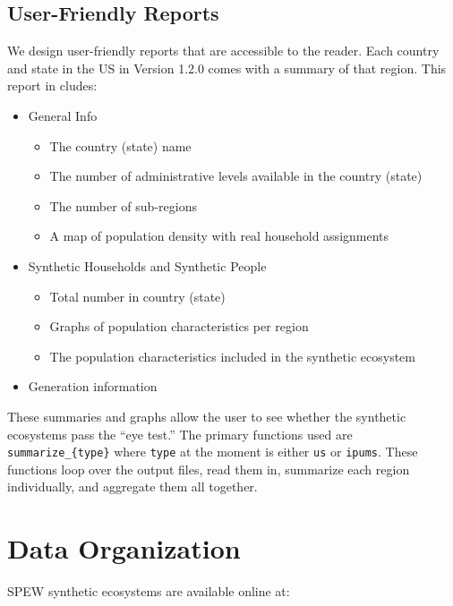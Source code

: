 \documentclass{article}
\begin{document}
                \subsection{User-Friendly Reports}
                We design user-friendly reports that are accessible to the reader.  Each country and state in the US  in Version 1.2.0 comes with a summary of that region.  This report in cludes:
                \begin{itemize}
                  \item General Info
                    \begin{itemize}
                    \item The country (state) name 
                    \item The number of administrative levels available in the country (state)
                    \item The number of sub-regions
                    \item A map of population density with real household assignments
                    \end{itemize}
                  \item Synthetic Households and Synthetic People
                    \begin{itemize}
                  \item Total number in country (state)
                  \item Graphs of population characteristics per region
                  \item The population characteristics included in the synthetic ecosystem
                    \end{itemize}
                  \item Generation information
                \end{itemize}
                \noindent These summaries and graphs allow the user to see whether the synthetic ecosystems pass the ``eye test.''  The primary functions used are \verb|summarize_{type}| where \texttt{type} at the moment is either \texttt{us} or \texttt{ipums}.  These functions loop over the output files, read them in, summarize each region individually, and aggregate them all together. 

                
                


                \newpage
\section{Data Organization}
SPEW synthetic ecosystems are available online at: 
\end{document}
